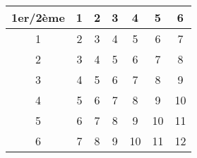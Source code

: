 \documentclass{standalone}
\begin{document}
\tiny{
\begin{center}
\begin{tabular}{|c||c|c|c|c|c|c|}\hline 1er/2\`eme & 1 & 2 & 3 & 4 & 5 & 6 \\ \hline\hline 1 & 2 & 3 & 4 & 5 & 6 & 7 \\\hline 2 & 3 & 4 & 5 & 6 & 7 & 8 \\\hline 3 & 4 & 5 & 6 & 7 & 8 & 9 \\\hline 4 & 5 & 6 & 7 & 8 & 9 & 10 \\\hline 5 & 6 & 7 & 8 & 9 & 10 & 11 \\\hline 6 & 7 & 8 & 9 & 10 & 11 & 12 \\\hline 
\end{tabular}
\end{center}}
\end{document}
